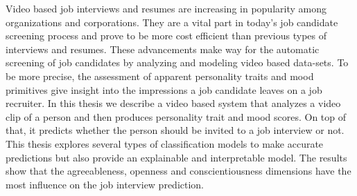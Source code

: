 Video based job interviews and resumes are increasing in popularity among organizations and corporations. They are a vital part in today's job candidate screening process and prove to be more cost efficient than previous types of interviews and resumes. These advancements make way for the automatic screening of job candidates by analyzing and modeling video based data-sets. To be more precise, the assessment of apparent personality traits and mood primitives give insight into the impressions a job candidate leaves on a job recruiter. In this thesis we describe a video based system that analyzes a video clip of a person and then produces personality trait and mood scores. On top of that, it predicts whether the person should be invited to a job interview or not. This thesis explores several types of classification models to make accurate predictions but also provide an explainable and interpretable model. The results show that the agreeableness, openness and conscientiousness dimensions have the most influence on the job interview prediction.

